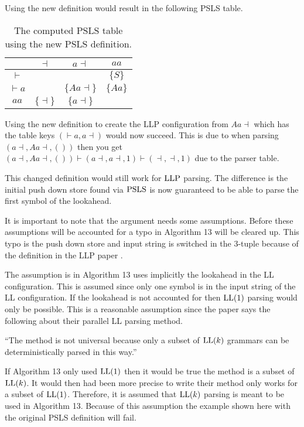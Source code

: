 Using the new definition would result in the following PSLS table.
\begin{table}[H]
    \centering
    \begin{tabular}{c|c|c|c}
        & $\dashv$ & $a\dashv$ & $aa$ \\ \hline
        $\vdash$ & & & $\{S\}$ \\\hline
        $\vdash a$ & & $\{Aa\dashv\}$ & $\{Aa\}$ \\\hline
        $aa$ & $\{\dashv\}$ & $\{a\dashv\}$ & 
    \end{tabular}
    \caption{The computed PSLS table using the new PSLS definition.}
\end{table}
\noindent Using the new definition to create the LLP configuration from $Aa\dashv$ which has the table keys $(\vdash a,a \dashv)$ would now succeed. This is due to when parsing $(a \dashv, Aa\dashv, ())$ then you get $(a \dashv, Aa\dashv, ()) \vdash (a \dashv, a\dashv, 1) \vdash ( \dashv, \dashv, 1)$ due to the parser table.

This changed definition would still work for $\text{LLP}$ parsing. The difference is the initial push down store found via $\text{PSLS}$ is now guaranteed to be able to parse the first symbol of the lookahead.

It is important to note that the argument needs some assumptions. Before these assumptions will be accounted for a typo in Algorithm 13 will be cleared up. This typo is the push down store and input string is switched in the 3-tuple because of the definition in the LLP paper \cite[5]{Vagner2007}.

The assumption is in Algorithm 13 uses implicitly the lookahead in the LL configuration. This is assumed since only one symbol is in the input string of the LL configuration. If the lookahead is not accounted for then $\text{LL}(1)$ parsing would only be possible. This is a reasonable assumption since the paper says the following about their parallel LL parsing method.
\begin{center}
    ``The method is not universal because only a subset of $\text{LL}(k)$ grammars can be deterministically parsed in this way.'' \cite[2]{Vagner2007}
\end{center}
If Algorithm 13 only used $\text{LL}(1)$ then it would be true the method is a subset of $\text{LL}(k)$. It would then had been more precise to write their method only works for a subset of $\text{LL}(1)$. Therefore, it is assumed that $\text{LL}(k)$ parsing is meant to be used in Algorithm 13. Because of this assumption the example shown here with the original PSLS definition will fail.

